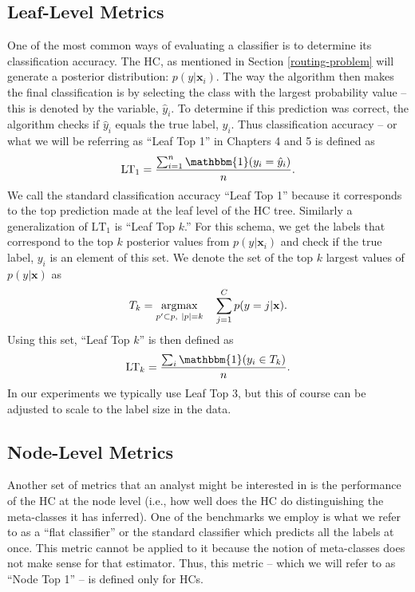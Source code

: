 \documentclass[../thesis.tex]{subfiles}
\begin{document}
\subsection{Leaf-Level Metrics}
One of the most common ways of evaluating a classifier is to determine its classification accuracy. The HC, as mentioned in Section \ref{routing-problem} will generate a posterior distribution: $p(y | \mathbf{x}_i)$. The way the algorithm then makes the final classification is by selecting the class with the largest probability value -- this is denoted by the variable, $\hat{y}_i$. To determine if this prediction was correct, the algorithm checks if $\hat{y}_i$ equals the true label, $y_i$. Thus classification accuracy -- or what we will be referring as ``Leaf Top 1'' in Chapters 4 and 5 is defined as
\begin{equation}
    \text{LT}_1 = \frac{\sum_{i=1}^n \mathbbm{1}(y_i = \hat{y}_i)}{n}.
\end{equation}
We call the standard classification accuracy ``Leaf Top 1'' because it corresponds to the top prediction made at the leaf level of the HC tree. Similarly a generalization of $\text{LT}_1$ is ``Leaf Top $k$.'' For this schema, we get the labels that correspond to the top $k$ posterior values from $p(y | \mathbf{x}_i)$ and check if the true label, $y_i$ is an element of this set. We denote the set of the top $k$ largest values of $p(y | \mathbf{x})$ as 
\begin{equation*}
    T_k = \underset{p^\prime \subset p, \ |p| = k}{\argmax} \quad \sum_{j=1}^C p(y = j | \mathbf{x}).
\end{equation*}
Using this set, ``Leaf Top $k$'' is then defined as
\begin{equation}
    \text{LT}_k = \frac{\sum_i \mathbbm{1}(y_i \in T_k)}{n}.
\end{equation}
In our experiments we typically use Leaf Top 3, but this of course can be adjusted to scale to the label size in the data.

\subsection{Node-Level Metrics}
Another set of metrics that an analyst might be interested in is the performance of the HC at the node level (i.e., how well does the HC do distinguishing the meta-classes it has inferred). One of the benchmarks we employ is what we refer to as a ``flat classifier'' or the standard classifier which predicts all the labels at once. This metric cannot be applied to it because the notion of meta-classes does not make sense for that estimator. Thus, this metric -- which we will refer to as ``Node Top 1'' -- is defined only for HCs. 
\end{document}
